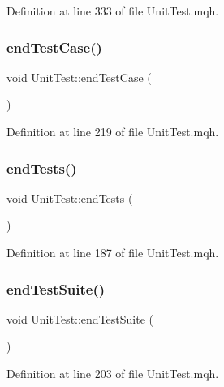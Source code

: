 Definition at line 333 of file Unit\+Test.\+mqh.

\mbox{\label{class_unit_test_a21569bcf4b15137b69354ce781cb5cdc}} 
\subsubsection{\texorpdfstring{end\+Test\+Case()}{endTestCase()}}
{\footnotesize\ttfamily void Unit\+Test\+::end\+Test\+Case (\begin{DoxyParamCaption}{ }\end{DoxyParamCaption})}



Definition at line 219 of file Unit\+Test.\+mqh.

\mbox{\label{class_unit_test_ada52d0c61149bd5f6fde7206a910b588}} 
\subsubsection{\texorpdfstring{end\+Tests()}{endTests()}}
{\footnotesize\ttfamily void Unit\+Test\+::end\+Tests (\begin{DoxyParamCaption}{ }\end{DoxyParamCaption})}



Definition at line 187 of file Unit\+Test.\+mqh.

\mbox{\label{class_unit_test_ae25097dc60a509270c0c8fd6d0b207d7}} 
\subsubsection{\texorpdfstring{end\+Test\+Suite()}{endTestSuite()}}
{\footnotesize\ttfamily void Unit\+Test\+::end\+Test\+Suite (\begin{DoxyParamCaption}{ }\end{DoxyParamCaption})}



Definition at line 203 of file Unit\+Test.\+mqh.

